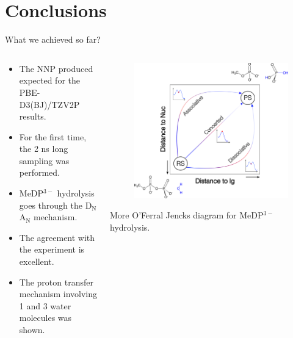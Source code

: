 \documentclass[11pt,t]{beamer}
\begin{document}
\section{Conclusions}
\begin{frame}{What we achieved so far?}
	\begin{columns}[t]
		\begin{column}{.55\textwidth}
		\vspace{-10pt}
		\small
		\begin{itemize}
			\item The NNP produced expected for the PBE-D3(BJ)/TZV2P results.
			\item For the first time, the 2 ns long sampling was performed.
			\item MeDP$^{3-}$ hydrolysis goes through the D$_\text{N}$A$_\text{N}$ mechanism.
			\item The agreement with the experiment is excellent.
			\item The proton transfer mechanism involving 1 and 3 water molecules was shown.
		\end{itemize}	
		\end{column}
		\begin{column}{.45\textwidth}
			\vspace{-25pt}
			\begin{figure}
				\centering
				\includegraphics[width=1.0\textwidth]{Figures/conclusions_mfj_plot.png}
			\end{figure}
			\centering
			\scriptsize
			More O'Ferral Jencks diagram for MeDP$^{3-}$ hydrolysis.
		\end{column}
	\end{columns}
\end{frame}
\end{document}
